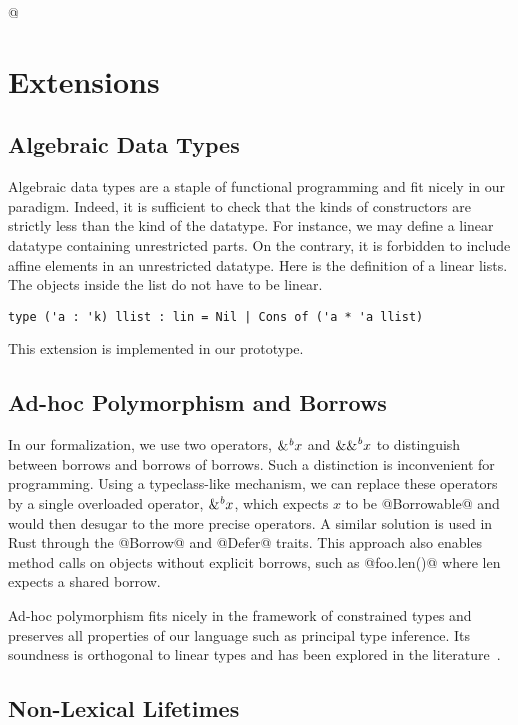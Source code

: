 \lstMakeShortInline[keepspaces,basicstyle=\small\ttfamily]@
\section{Extensions}

\subsection{Algebraic Data Types}

Algebraic data types are a staple of functional programming and fit nicely
in our paradigm. Indeed, it is sufficient to check that the kinds of constructors
are strictly less than the kind of the datatype.
For instance, we may define a linear datatype containing unrestricted
parts.
On the contrary, it is forbidden to include affine elements in an unrestricted
datatype.
Here is the definition of a linear lists. The objects inside the list do not have to be linear.

\begin{lstlisting}
type ('a : 'k) llist : lin = Nil | Cons of ('a * 'a llist)
\end{lstlisting}

This extension is implemented in our prototype.

\subsection{Ad-hoc Polymorphism and Borrows}

In our formalization, we use two operators, ${\&}^{\textit{b}}x$ and ${\&\&}^{\textit{b}}x$ to
distinguish between borrows and borrows of borrows.
Such a distinction is inconvenient for programming.
Using a typeclass-like mechanism, we can replace these operators
by a single overloaded operator, ${\&}^{\textit{b}}x$, which expects $x$ to be @Borrowable@ and
would then desugar to the more precise operators.
A similar solution is used in Rust through the @Borrow@ and @Defer@
traits.
This approach also enables method calls on objects without
explicit borrows, such as @foo.len()@ where len expects a shared borrow.

Ad-hoc polymorphism fits nicely in the framework of constrained
types and preserves all properties of our language such
as principal type inference. Its soundness is orthogonal to linear types
and has been explored in the literature~\citep{DBLP:journals/scp/Jones94}.

\subsection{Non-Lexical Lifetimes}

